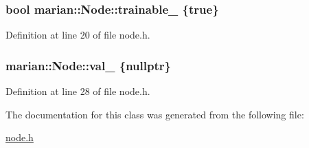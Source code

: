 \subsubsection[{\texorpdfstring{trainable\+\_\+}{trainable_}}]{\setlength{\rightskip}{0pt plus 5cm}bool marian\+::\+Node\+::trainable\+\_\+ \{true\}\hspace{0.3cm}{\ttfamily [protected]}}\hypertarget{classmarian_1_1Node_a2be04ac02fd33f507b55ab5915cad5cc}{}\label{classmarian_1_1Node_a2be04ac02fd33f507b55ab5915cad5cc}


Definition at line 20 of file node.\+h.

\subsubsection[{\texorpdfstring{val\+\_\+}{val_}}]{ marian\+::\+Node\+::val\+\_\+ \{nullptr\}\hspace{0.3cm}{\ttfamily [protected]}}\hypertarget{classmarian_1_1Node_ab64614c39ead91341c3d485dd0817cab}{}\label{classmarian_1_1Node_ab64614c39ead91341c3d485dd0817cab}


Definition at line 28 of file node.\+h.



The documentation for this class was generated from the following file\+:\begin{DoxyCompactItemize}
\item 
\hyperlink{node_8h}{node.\+h}\end{DoxyCompactItemize}
